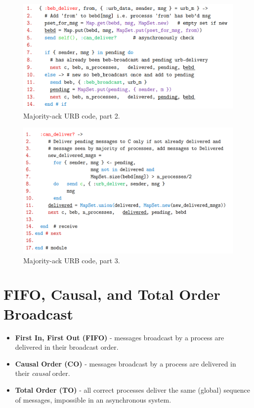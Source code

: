 \documentclass[11pt]{article}
\begin{document}
\begin{figure}[htb!]
  \centering
  \caption{Majority-ack URB code, part 2.}
  \includegraphics[scale=0.3]{urbcode2}
\end{figure}

\begin{figure}[htb!]
  \centering
  \caption{Majority-ack URB code, part 3.}
  \includegraphics[scale=0.3]{urbcode3}
\end{figure}

\section{FIFO, Causal, and Total Order Broadcast}
\begin{itemize}
  \item \textbf{First In, First Out (FIFO)} - messages broadcast by a process are delivered in their broadcast order.
  \item \textbf{Causal Order (CO)} - messages broadcast by a process are delivered in their \textit{causal} order.
  \item \textbf{Total Order (TO)} - all correct processes deliver the same (global) sequence of messages, impossible in an asynchronous system.
\end{itemize}
\end{document}
